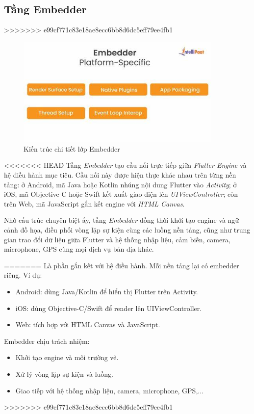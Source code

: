 \documentclass[../DoAn.tex]{subfiles}
\numberwithin{figure}{chapter}
\begin{document}
\subsection{Tầng Embedder} 
>>>>>>> e99cf771c83e18ae8ecc6bb8d6dc5eff79ee4fb1

\begin{figure}[H]
    \centering
    \includegraphics[width=0.9\textwidth]{Hinhve/Chuong5/embedderlayer.jpg}
    \caption{Kiến trúc chi tiết lớp Embedder}
    \label{fig:embedderlayer}
\end{figure}

<<<<<<< HEAD
Tầng \textit{Embedder} tạo cầu nối trực tiếp giữa \textit{Flutter Engine} và hệ điều hành mục tiêu. Cầu nối này được hiện thực khác nhau trên từng nền tảng: ở Android, mã Java hoặc Kotlin nhúng nội dung Flutter vào \textit{Activity}; ở iOS, mã Objective-C hoặc Swift kết xuất giao diện lên \textit{UIViewController}; còn trên Web, mã JavaScript gắn kết engine với \textit{HTML Canvas}.

Nhờ cấu trúc chuyên biệt ấy, tầng \textit{Embedder} đồng thời khởi tạo engine và ngữ cảnh đồ họa, điều phối vòng lặp sự kiện cùng các luồng nền tảng, cũng như trung gian trao đổi dữ liệu giữa Flutter và hệ thống nhập liệu, cảm biến, camera, microphone, GPS cùng mọi dịch vụ bản địa khác.

=======
Là phần gắn kết với hệ điều hành. Mỗi nền tảng lại có embedder riêng. Ví dụ:
\begin{itemize}
    \item Android: dùng Java/Kotlin để hiển thị Flutter trên Activity.
    \item iOS: dùng Objective-C/Swift để render lên UIViewController.
    \item Web: tích hợp với HTML Canvas và JavaScript.
\end{itemize}

Embedder chịu trách nhiệm:
    \begin{itemize}
        \item Khởi tạo engine và môi trường vẽ.
        \item Xử lý vòng lặp sự kiện và luồng.
        \item Giao tiếp với hệ thống nhập liệu, camera, microphone, GPS,...
    \end{itemize}
>>>>>>> e99cf771c83e18ae8ecc6bb8d6dc5eff79ee4fb1
\end{document}
